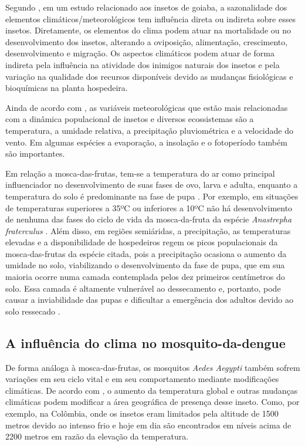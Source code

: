 Segundo , em um estudo relacionado aos insetos de goiaba, a sazonalidade dos elementos climáticos/meteorológicos tem influência direta ou indireta sobre esses insetos. Diretamente, os elementos do clima podem atuar na mortalidade ou no desenvolvimento dos insetos, alterando a oviposição, alimentação, crescimento, desenvolvimento e migração. Os aspectos climáticos podem atuar de forma indireta pela influência na atividade dos inimigos naturais dos insetos e pela variação na qualidade dos recursos disponíveis devido as mudanças fisiológicas e bioquímicas na planta hospedeira.

Ainda de acordo com , as variáveis meteorológicas que estão mais relacionadas com a dinâmica populacional de insetos e diversos ecossistemas são a temperatura, a umidade relativa, a precipitação pluviométrica e a velocidade do vento. Em algumas espécies a evaporação, a insolação e o fotoperíodo também são importantes.

Em relação a mosca-das-frutas, tem-se a temperatura do ar como principal influenciador no desenvolvimento de suas fases de ovo, larva e adulta, enquanto a temperatura do solo é predominante na fase de pupa \cite{garcia1998influencia}. Por exemplo, em situações de temperaturas superiores a 35ºC ou inferiores a 10ºC não há desenvolvimento de nenhuma das fases do ciclo de vida da mosca-da-fruta da espécie \textit{Anastrepha fraterculus} \cite{araujo2008levantamento}. Além disso, em regiões semiáridas, a precipitação, as temperaturas elevadas e a disponibilidade de hospedeiros regem os picos populacionais da mosca-das-frutas da espécie citada, pois a precipitação ocasiona o aumento da umidade no solo, viabilizando o desenvolvimento da fase de pupa, que em sua maioria ocorre numa camada contemplada pelos dez primeiros centímetros do solo. Essa camada é altamente vulnerável ao dessecamento e, portanto, pode causar a inviabilidade das pupas e dificultar a emergência dos adultos devido ao solo ressecado \cite{calore2013fatores, araujo2008levantamento}.

\subsection{A influência do clima no mosquito-da-dengue}

De forma análoga à mosca-das-frutas, os mosquitos \textit{Aedes Aegypti} também sofrem variações em seu ciclo vital e em seu comportamento mediante modificações climáticas. De acordo com , o aumento da temperatura global e outras mudanças climáticas podem modificar a área geográfica de presença desse inseto. Como, por exemplo, na Colômbia, onde os insetos eram limitados pela altitude de 1500 metros devido ao intenso frio e hoje em dia são encontrados em níveis acima de 2200 metros em razão da elevação da temperatura.
 
